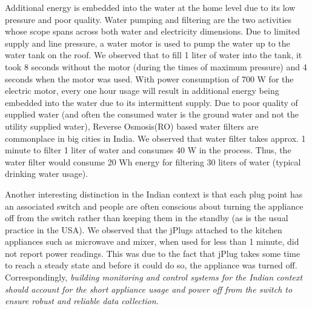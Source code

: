 \documentclass[10pt]{sensys-proc}
\newcommand{\redcolor}[1]{\textcolor{red}{#1}}
\begin{document}
\noindent Additional energy is embedded into the water at the home level due to its low pressure and poor quality. Water pumping and filtering are the two activities whose scope spans across both water and electricity dimensions. Due to limited supply and line pressure, a water motor is used to pump the water up to the water tank on the roof. We observed that to fill 1 liter of water into the tank, it took 8 seconds without the motor (during the times of maximum pressure) and 4 seconds when the motor was used. With power consumption of 700 W for the electric motor, every one hour usage will result in additional energy being embedded into the water due to its intermittent supply. %
Due to poor quality of supplied water (and often the consumed water is the ground water and not the utility supplied water), Reverse Osmosis(RO) based water filters are commonplace in big cities in India. We observed that water filter takes approx. 1 minute to filter 1 liter of water and consumes 40 W in the process. Thus, the water filter would consume 20 Wh energy for filtering 30 liters of water (typical drinking water usage).

\noindent Another interesting distinction in the Indian context is that each plug point has an associated switch and people are often conscious about turning the appliance off from the switch rather than keeping them in the standby (as is the usual practice in the USA). We observed that the jPlugs attached to the kitchen appliances such as microwave and mixer, when used for less than 1 minute, did not report power readings. This was due to the fact that jPlug takes some time to reach a steady state and before it could do so, the appliance was turned off.
Correspondingly, \emph{building monitoring and control systems for the Indian context should account for the short appliance usage and power off from the switch to ensure robust and reliable data collection.}
\end{document}
